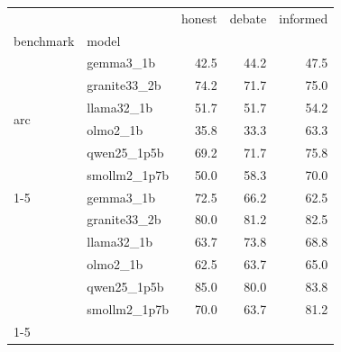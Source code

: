 \begin{tabular}{llrrr}
\toprule
 &  & honest & debate & informed \\
benchmark & model &  &  &  \\
\midrule
\multirow[t]{6}{*}{arc} & gemma3\_1b & 42.5 & 44.2 & 47.5 \\
 & granite33\_2b & 74.2 & 71.7 & 75.0 \\
 & llama32\_1b & 51.7 & 51.7 & 54.2 \\
 & olmo2\_1b & 35.8 & 33.3 & 63.3 \\
 & qwen25\_1p5b & 69.2 & 71.7 & 75.8 \\
 & smollm2\_1p7b & 50.0 & 58.3 & 70.0 \\
\cline{1-5}
\multirow[t]{6}{*}{boolq} & gemma3\_1b & 72.5 & 66.2 & 62.5 \\
 & granite33\_2b & 80.0 & 81.2 & 82.5 \\
 & llama32\_1b & 63.7 & 73.8 & 68.8 \\
 & olmo2\_1b & 62.5 & 63.7 & 65.0 \\
 & qwen25\_1p5b & 85.0 & 80.0 & 83.8 \\
 & smollm2\_1p7b & 70.0 & 63.7 & 81.2 \\
\cline{1-5}
\bottomrule
\end{tabular}
